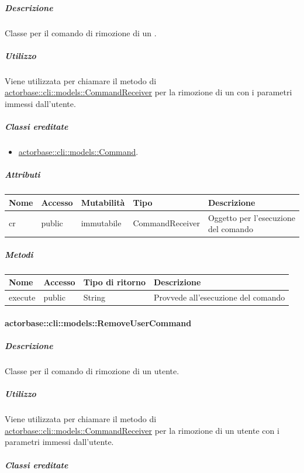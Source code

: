 \documentclass{scalatekids-article}
\begin{document}
\subparagraph{Descrizione}

Classe per il comando di rimozione di un .

\subparagraph{Utilizzo}

Viene utilizzata per chiamare il metodo di
\hyperref[sec:actorbase::cli::models::CommandReceiver]{actorbase::cli::models::CommandReceiver} per la rimozione di un 
con i parametri immessi dall'utente.

\subparagraph{Classi ereditate}

\begin{itemize}
\item \hyperref[sec:actorbase::cli::models::Command]{actorbase::cli::models::Command}.
\end{itemize}

\subparagraph{Attributi}

\begin{tabular}{| p{1cm} | p{1.5cm} | p{2cm} | p{4cm} | p{8.5cm} |}
  \hline
  Nome & Accesso & Mutabilità & Tipo & Descrizione\\
  \hline
  cr & public & immutabile & CommandReceiver & Oggetto per l'esecuzione del comando\\
  \hline
\end{tabular}

\subparagraph{Metodi}

\begin{tabular}{| l | l | l | l |}
  \hline
  Nome & Accesso & Tipo di ritorno & Descrizione\\
  \hline
  execute & public & String & Provvede all'esecuzione del comando\\
  \hline
\end{tabular}

\paragraph{actorbase::cli::models::RemoveUserCommand}
\label{sec:actorbase::cli::models::RemoveUserCommand}

\subparagraph{Descrizione}

Classe per il comando di rimozione di un utente.

\subparagraph{Utilizzo}

Viene utilizzata per chiamare il metodo di
\hyperref[sec:actorbase::cli::models::CommandReceiver]{actorbase::cli::models::CommandReceiver} per la rimozione di un utente con i
parametri immessi dall'utente.

\subparagraph{Classi ereditate}
\end{document}
